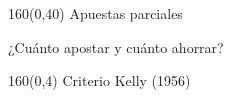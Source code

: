 \documentclass[shownotes,aspectratio=169]{beamer}
\begin{document}
%
%
%
%
%
%
%
%


\begin{frame}[plain]
\begin{textblock}{160}(0,40)
\centering \LARGE Apuestas parciales

\vspace{2cm}

¿Cuánto apostar y cuánto ahorrar?

\end{textblock}
\end{frame}



\begin{frame}[plain]
\begin{textblock}{160}(0,4)
\centering \LARGE Criterio Kelly (1956)
\end{textblock}



\end{frame}
\end{document}
